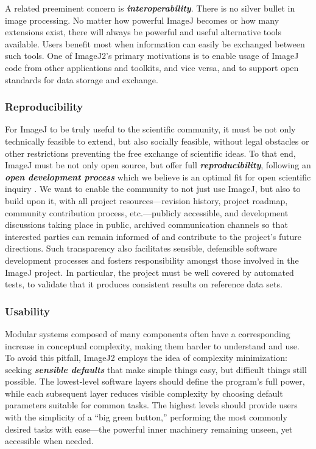 \documentclass{bmcart}
\begin{document}
A related preeminent concern is \textbf{\textit{interoperability}}. There is no
silver bullet in image processing. No matter how powerful ImageJ becomes or how
many extensions exist, there will always be powerful and useful alternative
tools available. Users benefit most when information can easily be exchanged
between such tools. One of ImageJ2's primary motivations is to enable usage of
ImageJ code from other applications and toolkits, and vice versa, and to
support open standards for data storage and exchange.

\subsubsection*{Reproducibility}
For ImageJ to be truly useful to the scientific community, it must be not only
technically feasible to extend, but also socially feasible, without legal
obstacles or other restrictions preventing the free exchange of scientific
ideas. To that end, ImageJ must be not only open source, but offer full
\textbf{\textit{reproducibility}}, following an \textbf{\textit{open
development process}} which we believe is an optimal fit for open scientific
inquiry \cite{software_usability}. We want to enable the community to not just
use ImageJ, but also to build upon it, with all project resources---revision
history, project roadmap, community contribution process, etc.---publicly
accessible, and development discussions taking place in public, archived
communication channels so that interested parties can remain informed of and
contribute to the project's future directions. Such transparency also
facilitates sensible, defensible software development processes and fosters
responsibility amongst those involved in the ImageJ project. In particular,
the project must be well covered by automated tests, to validate that it
produces consistent results on reference data sets.

\subsubsection*{Usability}
Modular systems composed of many components often have a corresponding increase
in conceptual complexity, making them harder to understand and use. To avoid
this pitfall, ImageJ2 employs the idea of complexity minimization: seeking
\textbf{\textit{sensible defaults}} that make simple things easy, but difficult
things still possible. The lowest-level software layers should define the
program's full power, while each subsequent layer reduces visible complexity by
choosing default parameters suitable for common tasks. The highest levels
should provide users with the simplicity of a ``big green button,'' performing
the most commonly desired tasks with ease---the powerful inner machinery
remaining unseen, yet accessible when needed.
\end{document}
